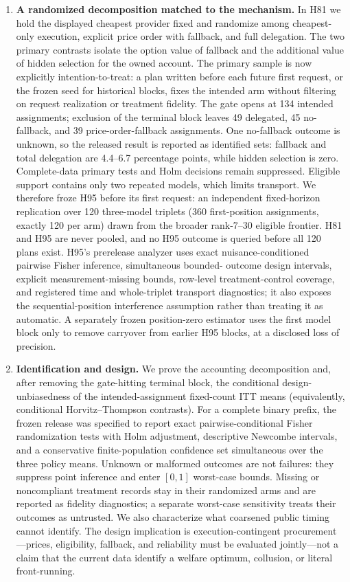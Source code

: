 \documentclass[11pt]{article}
\newcommand{\1}{\mathbf{1}}
\begin{document}
\begin{enumerate}
  \item \textbf{A randomized decomposition matched to the mechanism.}  In H81 we
  hold the displayed cheapest provider fixed and randomize among cheapest-only
  execution, explicit price order with fallback, and full delegation.  The two
  primary contrasts isolate the option value of fallback and the additional
  value of hidden selection for the owned account.  The primary sample is now
  explicitly intention-to-treat: a plan written before each future first request,
  or the frozen seed for historical blocks, fixes the intended arm without
  filtering on request realization or treatment fidelity.  The gate opens at
  134 intended assignments; exclusion of the terminal block leaves 49 delegated,
  45 no-fallback, and 39 price-order-fallback assignments.  One no-fallback
  outcome is unknown, so the released result is reported as identified sets:
  fallback and total delegation are 4.4--6.7 percentage points, while hidden
  selection is zero.  Complete-data primary tests and Holm decisions remain
  suppressed.  Eligible support contains only two repeated models, which limits
  transport.  We therefore froze H95 before its
  first request: an independent fixed-horizon replication over 120 three-model
  triplets (360 first-position assignments, exactly 120 per arm) drawn from the
  broader rank-7--30 eligible frontier.  H81 and H95 are never pooled, and no H95
  outcome is queried before all 120 plans exist.  H95's prerelease analyzer uses
  exact nuisance-conditioned pairwise Fisher inference, simultaneous bounded-
  outcome design intervals, explicit measurement-missing bounds, row-level
  treatment-control coverage, and registered time and whole-triplet transport
  diagnostics; it also exposes the sequential-position interference assumption
  rather than treating it as automatic.  A separately frozen position-zero
  estimator uses the first model block only to remove carryover from earlier H95
  blocks, at a disclosed loss of precision.

  \item \textbf{Identification and design.}  We prove the accounting
  decomposition and, after removing the gate-hitting terminal block, the
  conditional design-unbiasedness of the intended-assignment fixed-count ITT
  means (equivalently, conditional Horvitz--Thompson contrasts).  For a complete
  binary prefix, the frozen release was specified to report exact
  pairwise-conditional Fisher randomization tests with Holm adjustment,
  descriptive Newcombe intervals, and a conservative finite-population
  confidence set simultaneous over the three policy means.  Unknown or malformed outcomes are not failures:
  they suppress point inference and enter $[0,1]$ worst-case bounds.  Missing or
  noncompliant treatment records stay in their randomized arms and are reported
  as fidelity diagnostics; a separate worst-case sensitivity treats their
  outcomes as untrusted.
  We also characterize what coarsened public timing cannot identify.  The design
  implication is execution-contingent procurement---prices, eligibility,
  fallback, and reliability must be evaluated jointly---not a claim that the
  current data identify a welfare optimum, collusion, or literal front-running.
\end{enumerate}
\end{document}
